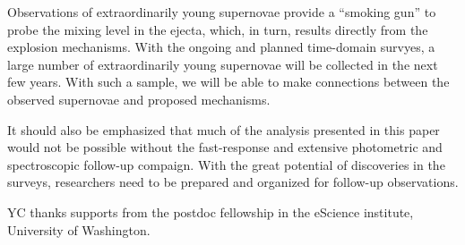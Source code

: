 \documentclass[twocolumn]{aastex61}
\begin{document}
Observations of extraordinarily young supernovae provide a ``smoking
gun'' to probe the mixing level in the ejecta, which, in turn, results
directly from the explosion mechanisms. With the ongoing and planned
time-domain survyes, a large number of extraordinarily young supernovae
will be collected in the next few years. With such a sample, we will
be able to make connections between the observed supernovae and proposed
mechanisms.

It should also be emphasized that much of the analysis presented in
this paper would not be possible without the fast-response and
extensive photometric and spectroscopic follow-up compaign. With the
great potential of discoveries in the surveys, researchers need to
be prepared and organized for follow-up observations.

\acknowledgements

YC thanks supports from the postdoc fellowship in the eScience
institute, University of Washington.



\end{document}
